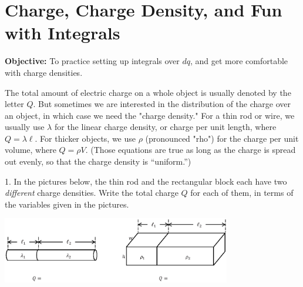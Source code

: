 \section{Charge, Charge Density, and Fun with Integrals}

\makelabheader %

\vspace{0.1in}
\textbf{Objective:} To practice setting up integrals over $dq$, and get more comfortable with charge densities.

\vspace{0.1in}
The total amount of electric charge on a whole object is usually denoted by the letter $Q$. But sometimes we are interested in the distribution of the charge over an object, in which case we need the "charge density."  For a thin rod or wire, we usually use $\lambda$ for the linear charge density, or charge per unit length, where $Q = \lambda \ell$. For thicker objects, we use $\rho$ (pronounced "rho") for the charge per unit volume, where $Q = \rho V$.  (Those equations are true as long as the charge is spread out evenly, so that the charge density is ``uniform.'')

1. In the pictures below, the thin rod and the rectangular block each have two \textit{different} charge densities.  Write the total charge $Q$ for each of them, in terms of the variables given in the pictures.
\begin{center}
\includegraphics[width=0.75\textwidth]{charge_density/fig1.eps}
\end{center}

